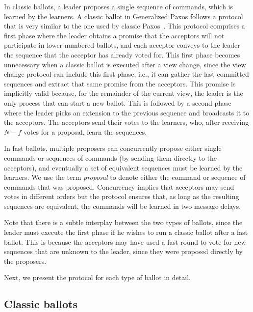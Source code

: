 In classic ballots, a leader proposes a single sequence of commands, which is learned by the learners. 
A classic ballot in Generalized Paxos follows a protocol that is very similar to the one used by classic Paxos~\cite{Lam98}. This protocol comprises a first phase where the leader obtains a promise that the acceptors will not participate in lower-numbered ballots, and each acceptor conveys to the leader the sequence that the acceptor has already voted for. This first phase becomes unnecessary when a classic ballot is executed after a view change, since the view change protocol can include this first phase, i.e., it can gather the last committed sequences and extract that same promise from the acceptors. This promise is implicitly valid because, for the remainder of the current view, the leader is the only process that can start a new ballot. This is followed by a second phase where the leader picks an extension to the previous sequence and broadcasts it to the acceptors. The acceptors send their votes to the learners, who, after receiving $N-f$ votes for a proposal, learn the sequences. 

In fast ballots, multiple proposers can concurrently propose either single commands or sequences of commands (by sending them directly to the acceptors), and eventually a set of equivalent sequences must be learned by the learners. We use the term \textit{proposal} to denote either the command or sequence of commands that was proposed.
Concurrency implies that acceptors may send votes in different orders but the protocol ensures that, as long as the resulting sequences are equivalent, the commands will be learned in two message delays. 

Note that there is a subtle interplay between the two types of ballots, since the leader must execute the first phase if he wishes to run a classic ballot after a fast ballot. This is because the acceptors may have used a fast round to vote for new sequences that are unknown to the leader, since they were proposed directly by the proposers.

Next, we present the protocol for each type of ballot in detail.

\subsection{Classic ballots} 

